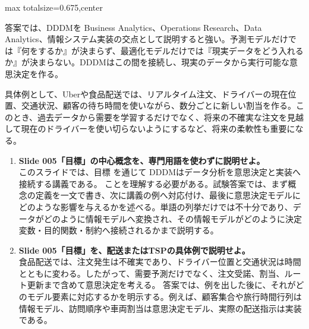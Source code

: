 \begin{adjustbox}{max totalsize={\textwidth}{0.675\textheight},center}
\begin{minipage}{\textwidth}
\begin{minipage}[t]{0.485\textwidth}
答案では、DDDMを Business Analytics、Operations Research、Data Analytics、情報システム実装の交点として説明すると強い。予測モデルだけでは『何をするか』が決まらず、最適化モデルだけでは『現実データをどう入れるか』が決まらない。DDDMはこの間を接続し、現実のデータから実行可能な意思決定を作る。\par
具体例として、Uberや食品配送では、リアルタイム注文、ドライバーの現在位置、交通状況、顧客の待ち時間を使いながら、数分ごとに新しい割当を作る。このとき、過去データから需要を学習するだけでなく、将来の不確実な注文を見越して現在のドライバーを使い切らないようにするなど、将来の柔軟性も重要になる。\par
{}
\begin{enumerate}
\item \textbf{Slide 005「目標」の中心概念を、専門用語を使わずに説明せよ。}\\このスライドでは、目標 を通じて DDDMはデータ分析を意思決定と実装へ接続する講義である。 ことを理解する必要がある。試験答案では、まず概念の定義を一文で書き、次に講義の例へ対応付け、最後に意思決定モデルにどのような影響を与えるかを述べる。単語の列挙だけでは不十分であり、データがどのように情報モデルへ変換され、その情報モデルがどのように決定変数・目的関数・制約へ接続されるかまで説明する。
\item \textbf{Slide 005「目標」を、配送またはTSPの具体例で説明せよ。}\\食品配送では、注文発生は不確実であり、ドライバー位置と交通状況は時間とともに変わる。したがって、需要予測だけでなく、注文受諾、割当、ルート更新まで含めて意思決定を考える。 答案では、例を出した後に、それがどのモデル要素に対応するかを明示する。例えば、顧客集合や旅行時間行列は情報モデル、訪問順序や車両割当は意思決定モデル、実際の配送指示は実装である。
\end{enumerate}
\end{minipage}
\end{minipage}
\end{adjustbox}

